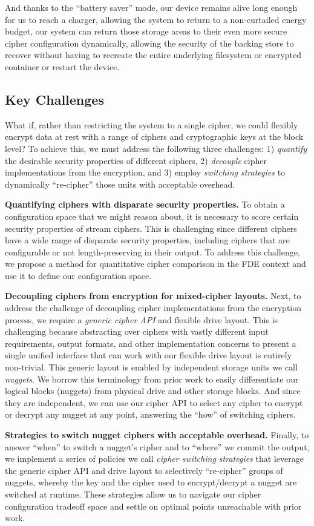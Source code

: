 And thanks to the ``battery saver'' mode, our device remains alive long enough
for us to reach a charger, allowing the system to return to a non-curtailed
energy budget, our system can return those storage areas to their even more
secure cipher configuration dynamically, allowing the security of the backing
store to recover without having to recreate the entire underlying filesystem or
encrypted container or restart the device.

\subsection{Key Challenges}

What if, rather than restricting the system to a single cipher, we could
flexibly encrypt data at rest with a range of ciphers and cryptographic keys at
the block level? To achieve this, we must address the following three
challenges: 1) \emph{quantify} the desirable security properties of different
ciphers, 2) \emph{decouple} cipher implementations from the encryption, and 3)
employ \emph{switching strategies} to dynamically ``re-cipher'' those units with
acceptable overhead.

\textbf{Quantifying ciphers with disparate security properties.} To obtain a
configuration space that we might reason about, it is necessary to score certain
security properties of stream ciphers. This is challenging since different
ciphers have a wide range of disparate security properties, including ciphers
that are configurable or not length-preserving in their output. To address this
challenge, we propose a method for quantitative cipher comparison in the FDE
context and use it to define our configuration space.

\textbf{Decoupling ciphers from encryption for mixed-cipher layouts.}
Next, to address the challenge of decoupling cipher implementations from the
encryption process, we require a \emph{generic cipher API} and flexible drive
layout. This is challenging because abstracting over ciphers with vastly
different input requirements, output formats, and other implementation concerns
to present a single unified interface that can work with our flexible drive
layout is entirely non-trivial. This generic layout is enabled by independent
storage units we call \emph{nuggets}. We borrow this terminology from prior work
to easily differentiate our logical blocks (nuggets) from physical drive and
other storage blocks. And since they are independent, we can use our cipher API
to select any cipher to encrypt or decrypt any nugget at any point, answering
the ``how'' of switching ciphers.

\textbf{Strategies to switch nugget ciphers with acceptable overhead.} Finally,
to answer ``when'' to switch a nugget's cipher and to ``where'' we commit the
output, we implement a series of policies we call \textit{cipher switching
strategies} that leverage the generic cipher API and drive layout to selectively
``re-cipher'' groups of nuggets, whereby the key and the cipher used to
encrypt/decrypt a nugget are switched at runtime. These strategies allow us to
navigate our cipher configuration tradeoff space and settle on optimal points
unreachable with prior work.
